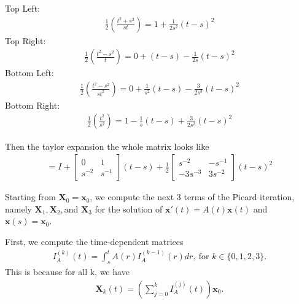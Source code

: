 \documentclass[12pt]{article}
\begin{document}
\noindent{}Top Left:
\begin{align*}
    \frac{1}{2} \left(\frac{t^2+s^2}{st}\right) = 1 + \frac{1}{2s^2}(t-s)^2
\end{align*}
Top Right:
\begin{align*}
    \frac{1}{2} \left(\frac{t^2-s^2}{t}\right) = 0 + (t-s) - \frac{1}{2s}(t-s)^2
\end{align*}
Bottom Left:
\begin{align*}
    \frac{1}{2} \left(\frac{t^2-s^2}{st^2}\right) = 0 + \frac{1}{s^2}(t-s) - \frac{3}{2s^3}(t-s)^2
\end{align*}
Bottom Right:
\begin{align*}
    \frac{1}{2} \left(\frac{t^2}{s^2}\right) = 1 - \frac{1}{s}(t-s) + \frac{3}{2s^2}(t-s)^2
\end{align*}

Then the taylor expansion the whole matrix looks like
\begin{align*}
    [\Phi_{t,s}] = I + \begin{bmatrix} 0 & 1 \\ s^{-2} & s^{-1} \end{bmatrix}(t-s) + \frac{1}{2}\begin{bmatrix} s^{-2} & -s^{-1} \\ -3s^{-3} & 3s^{-2} \end{bmatrix}(t-s)^2
\end{align*}


Starting from $\mathbf{X}_0 = \mathbf{x}_0$, we compute the next 3 terms of the Picard iteration,
namely $\mathbf{X}_1, \mathbf{X}_2, \text{and } \mathbf{X}_3$ for the solution of $\mathbf{x'}(t) = A(t)\mathbf{x}(t)$ and $\mathbf{x}(s) = \mathbf{x}_0$.

First, we compute the time-dependent matrices
\begin{align*}
    I^{(k)}_A(t) = \int_{s}^tA(r)I^{(k-1)}_A(r) dr, ~ \text{for } k\in{\{0,1,2,3\}}.
\end{align*}
This is because for all k, we have
\begin{align*}
    \mathbf{X}_k(t) = \left(\sum_{j=0}^{k}I^{(j)}_A(t)\right)\mathbf{x}_0.
\end{align*}
\end{document}
